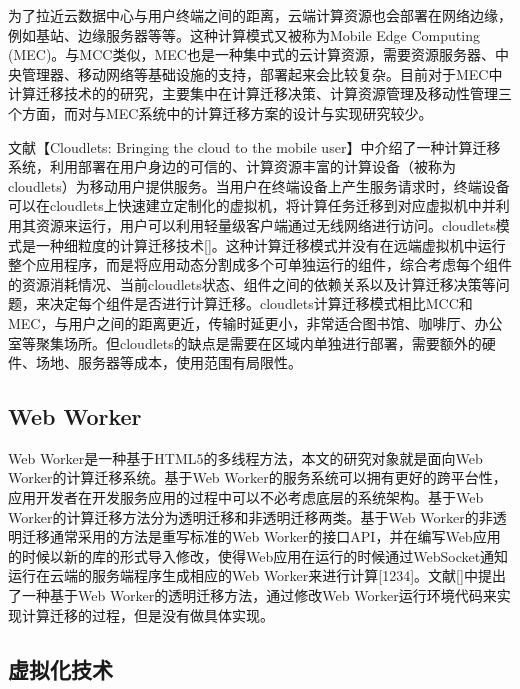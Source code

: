 为了拉近云数据中心与用户终端之间的距离，云端计算资源也会部署在网络边缘，例如基站、边缘服务器等等。这种计算模式又被称为Mobile Edge Computing (MEC)。与MCC类似，MEC也是一种集中式的云计算资源，需要资源服务器、中央管理器、移动网络等基础设施的支持，部署起来会比较复杂。目前对于MEC中计算迁移技术的的研究，主要集中在计算迁移决策、计算资源管理及移动性管理三个方面，而对与MEC系统中的计算迁移方案的设计与实现研究较少。

文献【Cloudlets: Bringing the cloud to the mobile user】中介绍了一种计算迁移系统，利用部署在用户身边的可信的、计算资源丰富的计算设备（被称为cloudlets）为移动用户提供服务。当用户在终端设备上产生服务请求时，终端设备可以在cloudlets上快速建立定制化的虚拟机，将计算任务迁移到对应虚拟机中并利用其资源来运行，用户可以利用轻量级客户端通过无线网络进行访问。cloudlets模式是一种细粒度的计算迁移技术[]。这种计算迁移模式并没有在远端虚拟机中运行整个应用程序，而是将应用动态分割成多个可单独运行的组件，综合考虑每个组件的资源消耗情况、当前cloudlets状态、组件之间的依赖关系以及计算迁移决策等问题，来决定每个组件是否进行计算迁移。cloudlets计算迁移模式相比MCC和MEC，与用户之间的距离更近，传输时延更小，非常适合图书馆、咖啡厅、办公室等聚集场所。但cloudlets的缺点是需要在区域内单独进行部署，需要额外的硬件、场地、服务器等成本，使用范围有局限性。

\subsection{Web Worker}

Web Worker是一种基于HTML5的多线程方法，本文的研究对象就是面向Web Worker的计算迁移系统。基于Web Worker的服务系统可以拥有更好的跨平台性，应用开发者在开发服务应用的过程中可以不必考虑底层的系统架构。基于Web Worker的计算迁移方法分为透明迁移和非透明迁移两类。基于Web Worker的非透明迁移通常采用的方法是重写标准的Web Worker的接口API，并在编写Web应用的时候以新的库的形式导入修改，使得Web应用在运行的时候通过WebSocket通知运行在云端的服务端程序生成相应的Web Worker来进行计算[1234]。文献[]中提出了一种基于Web Worker的透明迁移方法，通过修改Web Worker运行环境代码来实现计算迁移的过程，但是没有做具体实现。

\subsection{虚拟化技术}

